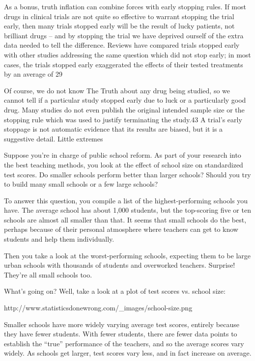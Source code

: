 As a bonus, truth inflation can combine forces with early stopping rules. If most drugs in clinical trials are not quite so effective to warrant stopping the trial early, then many trials stopped early will be the result of lucky patients, not brilliant drugs – and by stopping the trial we have deprived ourself of the extra data needed to tell the difference. Reviews have compared trials stopped early with other studies addressing the same question which did not stop early; in most cases, the trials stopped early exaggerated the effects of their tested treatments by an average of 29%

Of course, we do not know The Truth about any drug being studied, so we cannot tell if a particular study stopped early due to luck or a particularly good drug. Many studies do not even publish the original intended sample size or the stopping rule which was used to justify terminating the study.43 A trial’s early stoppage is not automatic evidence that its results are biased, but it is a suggestive detail.
Little extremes

Suppose you’re in charge of public school reform. As part of your research into the best teaching methods, you look at the effect of school size on standardized test scores. Do smaller schools perform better than larger schools? Should you try to build many small schools or a few large schools?

To answer this question, you compile a list of the highest-performing schools you have. The average school has about 1,000 students, but the top-scoring five or ten schools are almost all smaller than that. It seems that small schools do the best, perhaps because of their personal atmosphere where teachers can get to know students and help them individually.

Then you take a look at the worst-performing schools, expecting them to be large urban schools with thousands of students and overworked teachers. Surprise! They’re all small schools too.

What’s going on? Well, take a look at a plot of test scores vs. school size:

http://www.statisticsdonewrong.com/_images/school-size.png

Smaller schools have more widely varying average test scores, entirely because they have fewer students. With fewer students, there are fewer data points to establish the “true” performance of the teachers, and so the average scores vary widely. As schools get larger, test scores vary less, and in fact increase on average.

